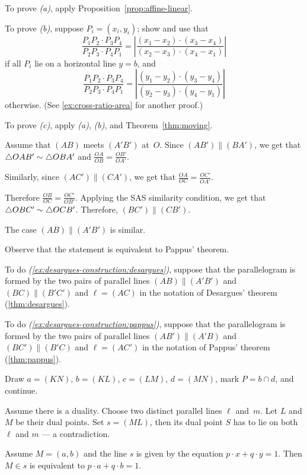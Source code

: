 To prove \textit{(a)}, apply Proposition~\ref{prop:affine-linear}.

To prove \textit{(b)}, suppose $P_i=(x_i,y_i)$;
show and use that 
\[\frac{P_1P_2\cdot P_3P_4}{P_2P_3\cdot P_4P_1}
=\left|\frac{(x_1-x_2)\cdot(x_3-x_4)}{(x_2-x_3)\cdot (x_4-x_1)}\right|\]
if all $P_i$ lie on a horizontal line $y=b$, and
\[\frac{P_1P_2\cdot P_3P_4}{P_2P_3\cdot P_4P_1}
=\left|\frac{(y_1-y_2)\cdot(y_3-y_4)}{(y_2-y_3)\cdot (y_4-y_1)}\right|\]
otherwise. (See \ref{ex:cross-ratio-area} for another proof.)


To prove \textit{(c)}, apply \textit{(a)}, \textit{(b)}, and Theorem~\ref{thm:moving}.

Assume that $(AB)$ meets $(A'B')$ at~$O$.
Since $(AB')\parallel (BA')$, we get that $\triangle OAB'\z\sim\triangle OBA'$
and
$\frac{OA}{OB}=\frac{OB'}{OA'}$.

Similarly, since $(AC')\parallel (CA')$, we get that
$\frac{OA}{OC}=\frac{OC'}{OA'}$.

Therefore
$\frac{OB}{OC}=\frac{OC'}{OB'}$.
Applying the SAS similarity condition, we get that
$\triangle OBC'\z\sim\triangle OCB'$.
Therefore, $(BC')\parallel (CB')$.

The case $(AB)\parallel(A'B')$ is similar.

 Observe that the statement is equivalent to Pappus' theorem.

To do \textit{(\ref{ex:desargues-construction:desargues})}, 
suppose that the parallelogram is formed by the two pairs of parallel lines $(AB)\parallel (A'B')$ and $(BC)\parallel(B'C')$ and $\ell=(AC)$ in the notation of Desargues' theorem (\ref{thm:desargues}).

To do \textit{(\ref{ex:desargues-construction:pappus})}, suppose that the parallelogram is formed by the two pairs of parallel lines $(AB')\parallel (A'B)$ and $(BC')\parallel(B'C)$ and $\ell=(AC')$ in the notation of Pappus' theorem (\ref{thm:pappus}).

Draw $a=(KN)$, $b=(KL)$, $c=(LM)$, $d=(MN)$, mark $P=b\cap d$, and continue. 

Assume there is a duality.
Choose two distinct parallel lines $\ell$ and~$m$.
Let $L$ and $M$ be their dual points.
Set $s=(ML)$, then its dual point $S$ has to lie on both $\ell$ and $m$ --- a contradiction.

Assume $M=(a,b)$ 
and the line $s$ is given by the equation $p\cdot x+q\cdot y=1$.
Then $M\in s$ is equivalent to $p\cdot a+q\cdot b=1$.

